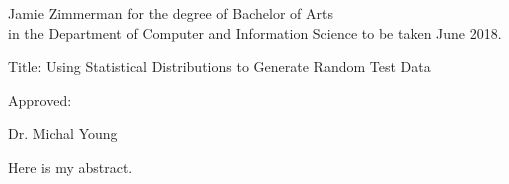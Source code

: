 \thispagestyle{plain}
\begin{center}


\normalsize Jamie Zimmerman for the degree of Bachelor of Arts \\
in the Department of Computer and Information Science to be taken June 2018.

\vspace{2cm}


Title: Using Statistical Distributions to Generate Random Test Data

\vspace{1.5cm}

Approved: \hrulefill

Dr. Michal Young

\end{center}
Here is my abstract.
 \vfill